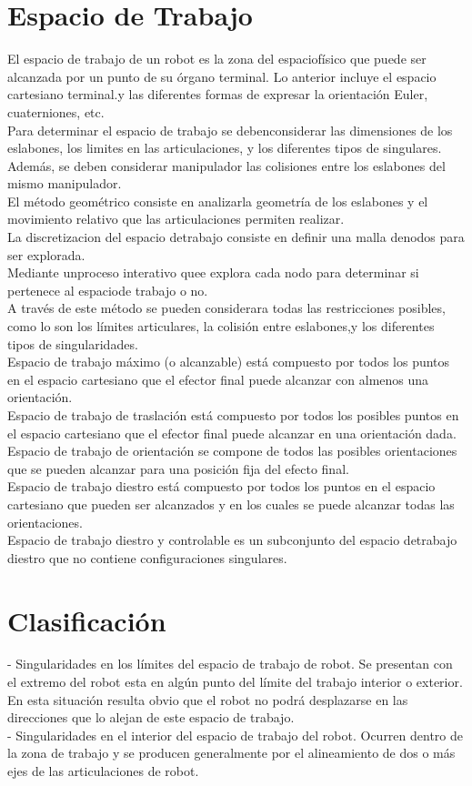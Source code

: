 \documentclass[11pt,a4paper,oldfontcommands,oneside]{memoir}
\begin{document}
\section{Espacio de Trabajo}
El espacio de trabajo de un robot es la zona del espaciofísico que puede ser alcanzada por un punto de su órgano terminal. Lo anterior incluye el espacio cartesiano terminal.y las diferentes formas de expresar la orientación Euler, cuaterniones, etc.\\
Para determinar el espacio de trabajo se debenconsiderar las dimensiones de los eslabones, los limites en las articulaciones, y los diferentes tipos de singulares.\\
Además, se deben considerar manipulador las colisiones entre los eslabones del mismo manipulador.\\
El método geométrico consiste en analizarla geometría de los eslabones y el movimiento relativo que las articulaciones permiten realizar.\\
La discretizacion del espacio detrabajo consiste en definir una malla denodos para ser explorada.\\ Mediante unproceso interativo quee explora cada nodo para determinar si pertenece al espaciode trabajo o no.\\A través de este método se pueden considerara todas las restricciones posibles, como lo son los límites articulares, la colisión entre eslabones,y los diferentes tipos de singularidades.\\
Espacio de trabajo máximo (o alcanzable) está compuesto por todos los puntos en el espacio cartesiano que el efector final puede alcanzar con almenos una orientación.\\
Espacio de trabajo de traslación está compuesto por todos los posibles puntos en el espacio cartesiano que el efector final puede alcanzar en una orientación dada.\\
Espacio de trabajo de orientación se compone de todos las posibles orientaciones que se pueden alcanzar para una posición fija del efecto final.\\
Espacio de trabajo diestro está compuesto por todos los puntos en el espacio cartesiano que pueden ser alcanzados y en los cuales se puede alcanzar todas las orientaciones.\\
Espacio de trabajo diestro y controlable es un subconjunto del espacio detrabajo diestro que no contiene configuraciones singulares.\cite{angeles1992kinematic}

\section{Clasificación}
-	Singularidades en los límites del espacio de trabajo de robot. Se presentan con el extremo del robot esta en algún punto del límite del trabajo interior o exterior. En esta situación resulta obvio que el robot no podrá desplazarse en las direcciones que lo alejan de este espacio de trabajo.\\
-	Singularidades en el interior del espacio de trabajo del robot. Ocurren dentro de la zona de trabajo y se producen generalmente por el alineamiento de dos o más ejes de las articulaciones de robot.
\end{document}
